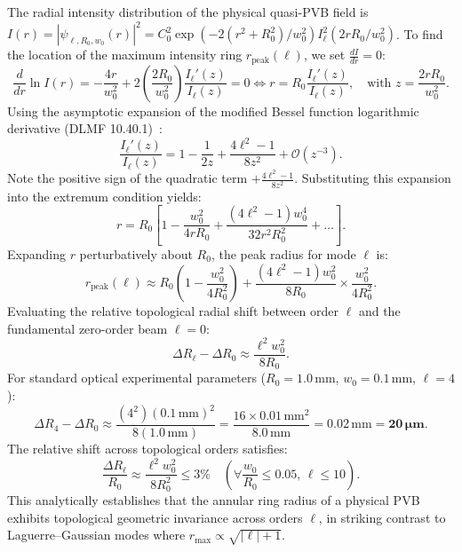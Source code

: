 \documentclass{optica-article}
\begin{document}
The radial intensity distribution of the physical quasi-PVB field is $I(r) = |\psi_{\ell, R_0, w_0}(r)|^2 = C_0^2 \exp(-2(r^2 + R_0^2)/w_0^2) I_\ell^2(2 r R_0 / w_0^2)$.
To find the location of the maximum intensity ring $r_{\text{peak}}(\ell)$, we set $\frac{d I}{dr} = 0$:
\begin{equation}
\frac{d}{dr} \ln I(r) = -\frac{4r}{w_0^2} + 2 \left( \frac{2 R_0}{w_0^2} \right) \frac{I_\ell'(z)}{I_\ell(z)} = 0 \iff r = R_0 \frac{I_\ell'(z)}{I_\ell(z)}, \quad \text{with } z = \frac{2 r R_0}{w_0^2}.
\label{eq:app_peak_derivative}
\end{equation}
Using the asymptotic expansion of the modified Bessel function logarithmic derivative (DLMF 10.40.1)~\cite{Arfken2012}:
\begin{equation}
\frac{I_\ell'(z)}{I_\ell(z)} = 1 - \frac{1}{2z} + \frac{4\ell^2 - 1}{8 z^2} + \mathcal{O}(z^{-3}).
\label{eq:app_ratio_bessel_deriv}
\end{equation}
Note the positive sign of the quadratic term $+ \frac{4\ell^2 - 1}{8 z^2}$. Substituting this expansion into the extremum condition yields:
\begin{equation}
r = R_0 \left[ 1 - \frac{w_0^2}{4 r R_0} + \frac{(4\ell^2 - 1) w_0^4}{32 r^2 R_0^2} + \dots \right].
\label{eq:app_r_expansion}
\end{equation}
Expanding $r$ perturbatively about $R_0$, the peak radius for mode $\ell$ is:
\begin{equation}
r_{\text{peak}}(\ell) \approx R_0 \left( 1 - \frac{w_0^2}{4 R_0^2} \right) + \frac{(4\ell^2 - 1) w_0^2}{8 R_0} \times \frac{w_0^2}{4 R_0^2}.
\label{eq:app_delta_r_ell}
\end{equation}
Evaluating the relative topological radial shift between order $\ell$ and the fundamental zero-order beam $\ell = 0$:
\begin{equation}
\boxed{\Delta R_\ell - \Delta R_0 \approx \frac{\ell^2 w_0^2}{8 R_0}.}
\label{eq:app_delta_r_final}
\end{equation}
For standard optical experimental parameters ($R_0 = 1.0\,\text{mm}$, $w_0 = 0.1\,\text{mm}$, $\ell = 4$):
\begin{equation}
\Delta R_4 - \Delta R_0 \approx \frac{(4^2)(0.1\,\text{mm})^2}{8(1.0\,\text{mm})} = \frac{16 \times 0.01\,\text{mm}^2}{8.0\,\text{mm}} = 0.02\,\text{mm} = \mathbf{20\,\mu\text{m}}.
\label{eq:app_shift_eval}
\end{equation}
The relative shift across topological orders satisfies:
\begin{equation}
\frac{\Delta R_\ell}{R_0} \approx \frac{\ell^2 w_0^2}{8 R_0^2} \le 3\% \quad \left( \forall \frac{w_0}{R_0} \le 0.05, \, \ell \le 10 \right).
\end{equation}
This analytically establishes that the annular ring radius of a physical PVB exhibits topological geometric invariance across orders $\ell$, in striking contrast to Laguerre--Gaussian modes where $r_{\max} \propto \sqrt{|\ell|+1}$.
\end{document}
